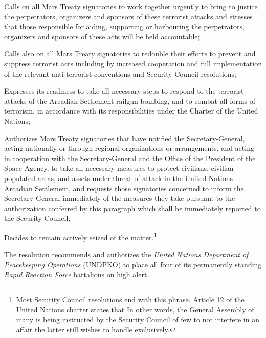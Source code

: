 \item Calls on all Mars Treaty signatories to work together urgently to bring to justice the perpetrators, organizers and sponsors of these terrorist attacks and stresses that those responsible for aiding, supporting or harbouring the perpetrators, organizers and sponsors of these acts will be held accountable;

\item Calls also on all Mars Treaty signatories to redouble their efforts to prevent and suppress terrorist acts including by increased cooperation and full implementation of the relevant anti-terrorist conventions and Security Council resolutions;

\item Expresses its readiness to take all necessary steps to respond to the terrorist attacks of the Arcadian Settlement railgun bombing, and to combat all forms of terrorism, in accordance with its responsibilities under the Charter of the United Nations;

\item Authorizes Mars Treaty signatories that have notified the Secretary-General, acting nationally or through regional organizations or arrangements, and acting in cooperation with the Secretary-General and the Office of the President of the Space Agency, to take all necessary measures to protect civilians, civilian populated areas, and assets under threat of attack in the United Nations Arcadian Settlement, and requests those signatories concerned to inform the Secretary-General immediately of the measures they take pursuant to the authorization conferred by this paragraph which shall be immediately reported to the Security Council;

\item Decides to remain actively seized of the matter.\footnote{Most Security Council resolutions end with this phrase. Article 12 of the United Nations charter states that  In other words, the General Assembly of many is being instructed by the Security Council of few to not interfere in an affair the latter still wishes to handle exclusively.}
\stopitemize
\stopTimelineGeneralDocument

The resolution recommends and authorizes the {\it United Nations Department of Peacekeeping Operations} (UNDPKO) to place all four of its permanently standing {\it Rapid Reaction Force} battalions on high alert.
\StopTimelineDate

